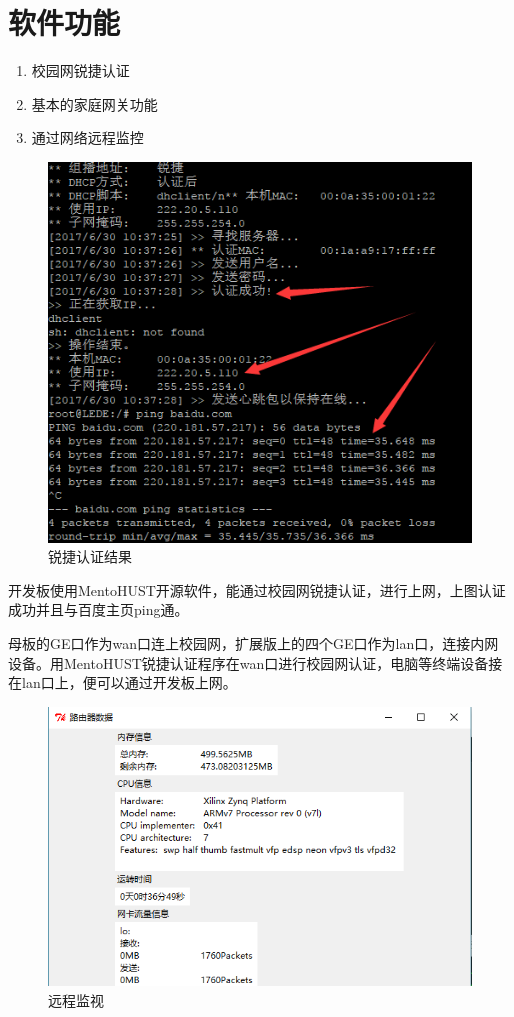 \documentclass{itecreport-zh}
\begin{document}
\section{软件功能}
\begin{enumerate}
    \item 校园网锐捷认证
    \item 基本的家庭网关功能
    \item 通过网络远程监控
\end{enumerate}

\begin{figure}[!h]
\centering
\includegraphics[width=.6\textwidth]{ruijie.png}
\caption{锐捷认证结果}
\end{figure}


开发板使用MentoHUST开源软件，能通过校园网锐捷认证，进行上网，上图认证成功并且与百度主页ping通。


母板的GE口作为wan口连上校园网，扩展版上的四个GE口作为lan口，连接内网设备。用MentoHUST锐捷认证程序在wan口进行校园网认证，电脑等终端设备接在lan口上，便可以通过开发板上网。


\begin{figure}[!h]
\centering
\includegraphics[width=.8\textwidth]{zynqinfo.png}
\caption{远程监视}
\end{figure}
\end{document}
